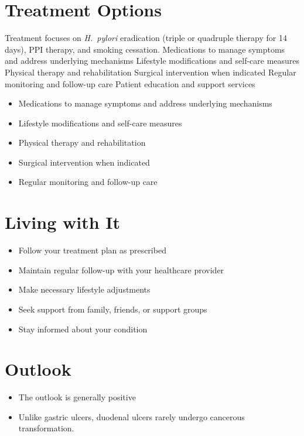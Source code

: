 \section{Treatment Options}
Treatment focuses on \textit{H.~pylori} eradication (triple or quadruple therapy for 14 days), PPI therapy, and smoking cessation. Medications to manage symptoms and address underlying mechanisms Lifestyle modifications and self-care measures Physical therapy and rehabilitation Surgical intervention when indicated Regular monitoring and follow-up care Patient education and support services

\begin{itemize}[noitemsep]
  \item Medications to manage symptoms and address underlying mechanisms
  \item Lifestyle modifications and self-care measures
  \item Physical therapy and rehabilitation
  \item Surgical intervention when indicated
  \item Regular monitoring and follow-up care
\end{itemize}
\section{Living with It}
\begin{itemize}[noitemsep]
  \item Follow your treatment plan as prescribed
  \item Maintain regular follow-up with your healthcare provider
  \item Make necessary lifestyle adjustments
  \item Seek support from family, friends, or support groups
  \item Stay informed about your condition
\end{itemize}
\section{Outlook}
\begin{itemize}[noitemsep]
  \item The outlook is generally positive
  \item Unlike gastric ulcers, duodenal ulcers rarely undergo cancerous transformation.
\end{itemize}
